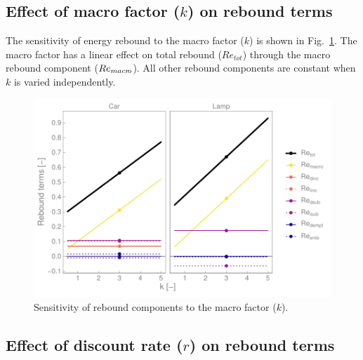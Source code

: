 \documentclass[12pt]{article}\usepackage[]{graphicx}\usepackage[]{xcolor}
\makeatletter
\def\maxwidth{ %
  \ifdim\Gin@nat@width>\linewidth
    \linewidth
  \else
    \Gin@nat@width
  \fi
}
\newenvironment{knitrout}{}{} %
\makeatother
\begin{document}
  
\subsection{Effect of macro factor ($k$) on rebound terms} 
\label{sec:effect_of_macro_factor}

The sensitivity of energy rebound 
to the macro factor ($k$) is shown 
in Fig.~\ref{fig:all_Re_terms_k_graph}.
The macro factor has a linear effect on total rebound ($Re_{tot}$)
through the macro rebound component ($Re_{macr\!o}$).
All other rebound components are constant when $k$ is varied independently.

\begin{knitrout}
\color{fgcolor}\begin{figure}

{\centering \includegraphics[width=\maxwidth]{figure/all_Re_terms_k_graph-1} 

}

\caption[Sensitivity of rebound components to the macro factor ($k$)]{Sensitivity of rebound components to the macro factor ($k$).}\label{fig:all_Re_terms_k_graph}
\end{figure}

\end{knitrout}
  
  
\subsection{Effect of discount rate ($r$) on rebound terms} 
\label{sec:effect_of_discount_rate}
\end{document}
